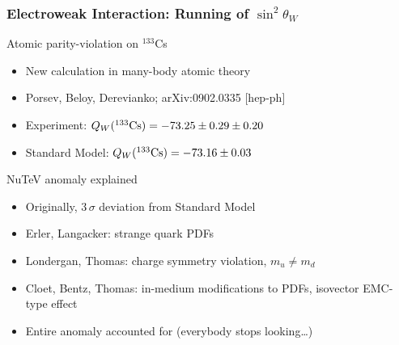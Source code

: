 \begin{frame}
 \frametitle{Electroweak Interaction: Running of $\sin^2 \theta_W$}
 \begin{block}{Atomic parity-violation on $^{133}$Cs}
  \begin{itemize}
   \item New calculation in many-body atomic theory
   \item Porsev, Beloy, Derevianko; arXiv:0902.0335 [hep-ph]
   \item Experiment: $Q_W(^{133}\hbox{Cs}) = -73.25 \pm 0.29 \pm 0.20$
   \item Standard Model: $Q_W(^{133}\hbox{Cs}) = -73.16 \pm 0.03$
  \end{itemize}
 \end{block}
 \begin{block}{NuTeV anomaly explained}
  \begin{itemize}
   \item Originally, $3\,\sigma$ deviation from Standard Model
   \item Erler, Langacker: strange quark PDFs
   \item Londergan, Thomas: charge symmetry violation, $m_u \neq m_d$
   \item Cloet, Bentz, Thomas: in-medium modifications to PDFs, isovector EMC-type effect
   \item Entire anomaly accounted for (everybody stops looking\ldots)
  \end{itemize}
 \end{block}
\end{frame}
